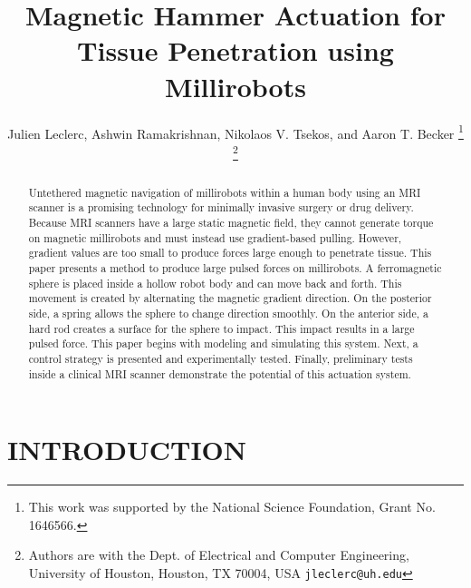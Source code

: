 \documentclass[letterpaper, 10 pt, conference]{ieeeconf}  %
\title{\LARGE \bf
Magnetic Hammer Actuation for Tissue Penetration using Millirobots}
\author{Julien Leclerc, Ashwin Ramakrishnan, Nikolaos V. Tsekos, and Aaron T. Becker %
\thanks{This work was supported by the National Science Foundation, Grant No. 1646566. }%
\thanks{Authors are with the Dept. of Electrical and Computer
Engineering, University of Houston, Houston, TX 70004, USA
        {\tt\small jleclerc@uh.edu}}%
}
\begin{document}
\maketitle
\thispagestyle{empty}
\pagestyle{empty}


\begin{abstract}

Untethered magnetic navigation of millirobots within a human body using an MRI scanner is a promising technology for minimally invasive surgery or drug delivery.
Because MRI scanners have a large static magnetic field, they cannot generate torque on magnetic millirobots and must instead use gradient-based pulling.
 However, gradient values are too small to produce forces large enough to penetrate tissue. 
 This paper presents a method to produce large pulsed forces on millirobots. 
 A ferromagnetic sphere is placed inside a hollow robot body and can move back and forth. 
 This movement is created by alternating the magnetic gradient direction. 
 On the posterior side, a spring allows the sphere to change direction smoothly. 
 On the anterior side, a hard rod creates a surface for the sphere to impact. 
 This impact results in a large pulsed force. 
 This paper begins with modeling and simulating this system. 
 Next, a control strategy is presented and experimentally tested.
  Finally, preliminary tests inside a clinical MRI scanner demonstrate the potential of this actuation system. 

\end{abstract}


\section{INTRODUCTION}
\end{document}
